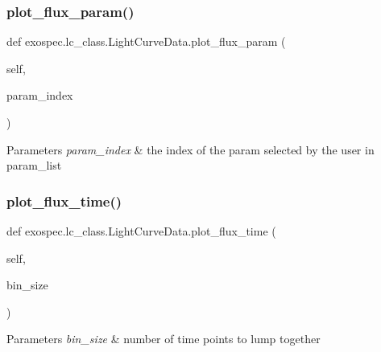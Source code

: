 \subsubsection{\texorpdfstring{plot\+\_\+flux\+\_\+param()}{plot\_flux\_param()}}
{\footnotesize\ttfamily def exospec.\+lc\+\_\+class.\+Light\+Curve\+Data.\+plot\+\_\+flux\+\_\+param (\begin{DoxyParamCaption}\item[{}]{self,  }\item[{}]{param\+\_\+index }\end{DoxyParamCaption})}


\begin{DoxyParams}{Parameters}
{\em param\+\_\+index} & the index of the param selected by the user in param\+\_\+list \\
\hline
\end{DoxyParams}
\mbox{\label{classexospec_1_1lc__class_1_1_light_curve_data_a3e63540e9bb38ce3415d27527e8c6ba9}} 
\subsubsection{\texorpdfstring{plot\+\_\+flux\+\_\+time()}{plot\_flux\_time()}}
{\footnotesize\ttfamily def exospec.\+lc\+\_\+class.\+Light\+Curve\+Data.\+plot\+\_\+flux\+\_\+time (\begin{DoxyParamCaption}\item[{}]{self,  }\item[{}]{bin\+\_\+size }\end{DoxyParamCaption})}


\begin{DoxyParams}{Parameters}
{\em bin\+\_\+size} & number of time points to lump together \\
\hline
\end{DoxyParams}
\mbox{\label{classexospec_1_1lc__class_1_1_light_curve_data_ad216feba69b805a0732a43555354c76d}} 
